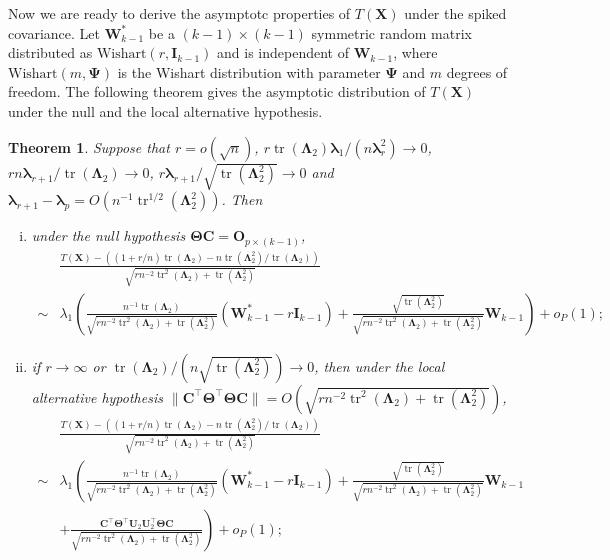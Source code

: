 \documentclass[12pt]{article} %
\DeclareMathOperator{\mytr}{tr}
\newcommand{\bX}{\mathbf{X}}
\newcommand{\bC}{\mathbf{C}}
\newcommand{\bO}{\mathbf{O}}
\newcommand{\bI}{\mathbf{I}}
\newcommand{\bU}{\mathbf{U}}
\newcommand{\bW}{\mathbf{W}}
\newcommand{\bfsym}[1]{\ensuremath{\boldsymbol{#1}}}
\def\blambda {\bfsym {\lambda}}
\def\bLambda {\bfsym {\Lambda}}
\def\bTheta {\bfsym {\Theta}}
\def\bPsi {\bfsym {\Psi}}
\newtheorem{theorem}{Theorem}
\theoremstyle{definition}
\begin{document}
Now we are ready to derive the asymptotc properties of $T(\bX)$ under the spiked covariance.
Let $\bW^*_{k-1}$ be a $(k-1)\times (k-1)$ symmetric random matrix distributed as $\textrm{Wishart}(r,\bI_{k-1})$ and is independent of $\bW_{k-1}$, where $\textrm{Wishart}(m,\bPsi)$ is the Wishart distribution with parameter $\bPsi$ and $m$ degrees of freedom.
The following theorem gives the asymptotic distribution of $T(\bX)$ under the null and the local alternative hypothesis.
\begin{theorem}\label{thm1}
    Suppose that $r=o(\sqrt{n})$, $r\mytr(\bLambda_2)\blambda_1/(n\blambda_r^2)\to 0$, $rn\blambda_{r+1} /\mytr(\bLambda_2)\to 0$,
    $r\blambda_{r+1}/\sqrt{\mytr(\bLambda_2^2)}\to 0$ and $\blambda_{r+1}-\blambda_p=O(n^{-1}\mytr^{1/2}(\bLambda_2^2))$.
    Then
    \begin{enumerate}[(i)]
        \item 
            under the null hypothesis $\bTheta \bC=\bO_{p\times (k-1)}$,
\begin{equation*}
    \begin{split}
&
\frac{
    T(\bX)
    -
    \left((1+r/n)\mytr(\bLambda_2)-n\mytr(\bLambda_2^2)/\mytr(\bLambda_2)\right)
}{
    \sqrt{
        rn^{-2}\mytr^2(\bLambda_2)+ 
        \mytr(\bLambda_2^2)
    }
}
\\
\sim &
\lambda_1
\left(
\frac{
    n^{-1} \mytr(\bLambda_2)
}{
    \sqrt{
        rn^{-2} \mytr^2 (\bLambda_2) + \mytr(\bLambda_2^2)
    }
}
(\bW_{k-1}^* - r\bI_{k-1})
+
\frac{
    \sqrt{\mytr(\bLambda_2^2)}
}{
    \sqrt{
        rn^{-2} \mytr^2 (\bLambda_2) + \mytr(\bLambda_2^2)
    }
}
\bW_{k-1}
\right)
+o_P(1);
    \end{split}
\end{equation*}
        \item
            if $r\to \infty$ or $\mytr(\bLambda_2)/(n \sqrt{\mytr(\bLambda_2^2)})\to 0$, then under the local alternative hypothesis $\|\bC^\top \bTheta^\top \bTheta \bC\|=O(\sqrt{
        rn^{-2} \mytr^2 (\bLambda_2) + \mytr(\bLambda_2^2)
            })$,
\begin{equation*}
    \begin{split}
&
\frac{
    T(\bX)
    -
    \left((1+r/n)\mytr(\bLambda_2)-n\mytr(\bLambda_2^2)/\mytr(\bLambda_2)\right)
}{
    \sqrt{
        rn^{-2}\mytr^2(\bLambda_2)+ 
        \mytr(\bLambda_2^2)
    }
}
\\
\sim &
\lambda_1
\left(
\frac{
    n^{-1} \mytr(\bLambda_2)
}{
    \sqrt{
        rn^{-2} \mytr^2 (\bLambda_2) + \mytr(\bLambda_2^2)
    }
}
(\bW_{k-1}^* - r\bI_{k-1})
+
\frac{
    \sqrt{\mytr(\bLambda_2^2)}
}{
    \sqrt{
        rn^{-2} \mytr^2 (\bLambda_2) + \mytr(\bLambda_2^2)
    }
}
\bW_{k-1}
\right.
\\
&
+\left.
\frac{
    \bC^\top \bTheta^\top \bU_2 \bU_2^\top \bTheta \bC
}{
    \sqrt{
        rn^{-2} \mytr^2 (\bLambda_2) + \mytr(\bLambda_2^2)
    }
}
\right)
+o_P(1);
    \end{split}
\end{equation*}
    \end{enumerate}
\end{theorem}
\end{document}
